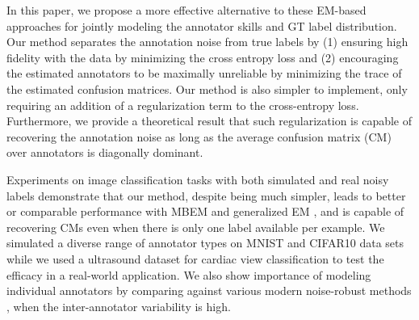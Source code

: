 

In this paper, we propose a more effective alternative to these EM-based approaches for jointly modeling the annotator skills and GT label distribution. Our method separates the annotation noise from true labels by
(1) ensuring high fidelity with the data by minimizing the cross entropy loss and (2) encouraging the estimated annotators to be maximally unreliable by minimizing the trace of the estimated confusion matrices. Our method is also simpler to implement, only requiring an addition of a regularization term to the cross-entropy loss. Furthermore, we provide a theoretical result that such regularization is capable of recovering the annotation noise as long as the average confusion matrix (CM) over annotators is diagonally dominant. 

Experiments on image classification tasks with both simulated and real noisy labels demonstrate that our method, despite being much simpler, leads to better or comparable performance with MBEM \cite{khetan2017learning} and generalized EM \cite{raykar2009supervised,raykar2010learning}, and is capable of recovering CMs even when there is only one label available per example. We simulated a diverse range of annotator types on MNIST and CIFAR10 data sets while we used a ultrasound dataset for cardiac view classification to test the efficacy in a real-world application. We also show importance of modeling individual annotators by comparing against various modern noise-robust methods \cite{reed2014training,sukhbaatar2014training,goldberger2016training,guan2017said}, when the inter-annotator variability is high. 

